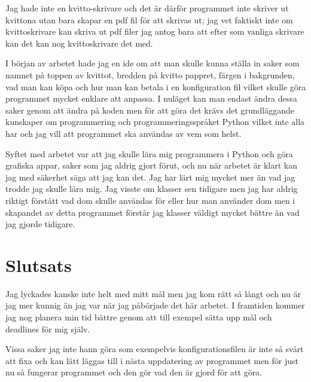 \documentclass[a4paper, 12pt]{article}
\begin{document}
Jag hade inte en kvitto-skrivare och det är därför programmet inte skriver ut kvittona utan bara skapar en pdf fil för att skrivas ut; jag vet faktiskt inte om kvittoskrivare kan skriva ut pdf filer jag antog bara att efter som vanliga skrivare kan det kan nog kvittoskrivare det med.


I början av arbetet hade jag en ide om att man skulle kunna ställa in saker som namnet på toppen av kvittot, bredden på kvitto pappret, färgen i bakgrunden, vad man kan köpa och hur man kan betala i en konfiguration fil vilket skulle göra programmet mycket enklare att anpassa. I nuläget kan man endast ändra dessa saker genom att ändra på koden men för att göra det krävs det grundläggande kunskaper om programmering och programmeringsspråket Python vilket inte alla har och jag vill att programmet ska användas av vem som helst.



Syftet med arbetet var att jag skulle lära mig programmera i Python och göra grafiska appar, saker som jag aldrig gjort förut, och nu när arbetet är klart kan jag med säkerhet säga att jag kan det. Jag har lärt mig mycket mer än vad jag trodde jag skulle lära mig. Jag visste om klasser sen tidigare men jag har aldrig riktigt förstått vad dom skulle användas för eller hur man använder dom men i skapandet av detta programmet förstår jag klasser väldigt mycket bättre än vad jag gjorde tidigare.


\section{Slutsats}

Jag lyckades kanske inte helt med mitt mål men jag kom rätt så långt och nu är jag mer kunnig än jag var när jag påbörjade det här arbetet.
I framtiden kommer jag nog planera min tid bättre genom att till exempel sätta upp mål och deadlines för mig själv.

Vissa saker jag inte hann göra som exempelvis konfigurationsfilen är inte så svårt att fixa och kan lätt läggas till i nästa uppdatering av programmet men för just nu så fungerar programmet och den gör vad den är gjord för att göra.  


\newpage 

%

\printbibliography
\end{document}
